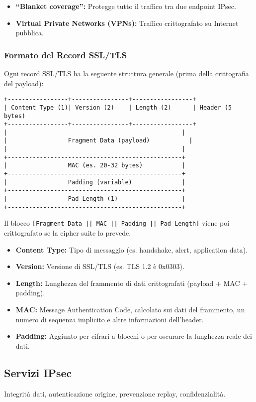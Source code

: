 \begin{itemize}
    \item \textbf{\textquotedblleft Blanket coverage\textquotedblright{}:} Protegge tutto il traffico tra due endpoint IPsec.
    \item \textbf{Virtual Private Networks (VPNs):} Traffico crittografato su Internet pubblica.
\end{itemize}

\subsubsection{Formato del Record SSL/TLS}
\label{ssubsec:ssl_record_format}
Ogni record SSL/TLS ha la seguente struttura generale (prima della crittografia del payload):
\begin{verbatim}
+-----------------+----------------+-----------------+
| Content Type (1)| Version (2)    | Length (2)      | Header (5 bytes)
+-----------------+----------------+-----------------+
|                                                 |
|                 Fragment Data (payload)           |
|                                                 |
+-------------------------------------------------+
|                 MAC (es. 20-32 bytes)           |
+-------------------------------------------------+
|                 Padding (variable)              |
+-------------------------------------------------+
|                 Pad Length (1)                  |
+-------------------------------------------------+
\end{verbatim}
Il blocco \texttt{[Fragment Data || MAC || Padding || Pad Length]} viene poi crittografato se la cipher suite lo prevede.
\begin{itemize}
    \item \textbf{Content Type:} Tipo di messaggio (es. handshake, alert, application data).
    \item \textbf{Version:} Versione di SSL/TLS (es. TLS 1.2 è 0x0303).
    \item \textbf{Length:} Lunghezza del frammento di dati crittografati (payload + MAC + padding).
    \item \textbf{MAC:} Message Authentication Code, calcolato sui dati del frammento, un numero di sequenza implicito e altre informazioni dell'header.
    \item \textbf{Padding:} Aggiunto per cifrari a blocchi o per oscurare la lunghezza reale dei dati.
\end{itemize}

\subsection{Servizi IPsec}
Integrità dati, autenticazione origine, prevenzione replay, confidenzialità.

